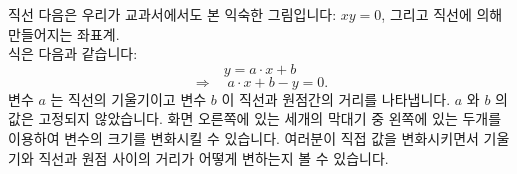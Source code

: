 \begin{surferPage}{직선}
다음은 우리가 교과서에서도 본 익숙한 그림입니다: $xy=0$, 그리고 직선에 의해 만들어지는 좌표계. \\식은 다음과 같습니다:
\[y=a\cdot x + b\]
\[ \Rightarrow \quad a\cdot x +b -y=0.\]
변수 $a$ 는  직선의 기울기이고 변수 $b$ 이 직선과 원점간의 거리를 나타냅니다.
\newline \newline
$a$ 와 $b$ 의 값은 고정되지 않았습니다. 화면 오른쪽에 있는 세개의 막대기 중 왼쪽에 있는 두개를 이용하여 변수의 크기를 변화시킬 수 있습니다. 여러분이 직접 값을 변화시키면서 기울기와 직선과 원점 사이의 거리가 어떻게 변하는지 볼 수 있습니다.
\end{surferPage}
